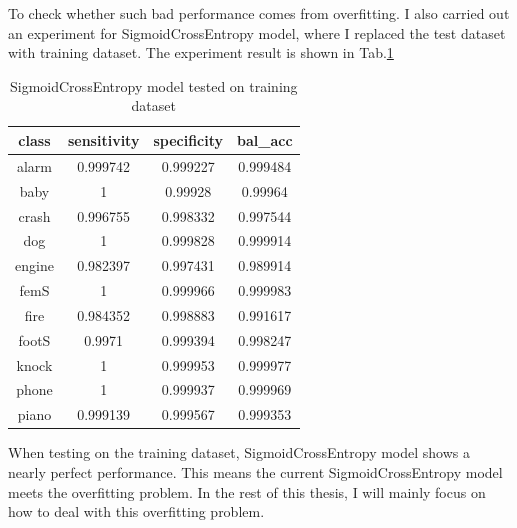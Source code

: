 To check whether such bad performance comes from overfitting. I also carried out an experiment for SigmoidCrossEntropy model, where I replaced the test dataset with training dataset. The experiment result is shown in Tab.\ref{tab:SCEoverfitting}
\begin{table}[h!]
	\caption{SigmoidCrossEntropy model tested on training dataset}
	\label{tab:SCEoverfitting}
	\centering
	\begin{tabular}{|c|c|c|c|}
		\hline	class 	&	 \textbf{sensitivity}	&	 \textbf{specificity} 	&	 \textbf{bal\_acc}	\\
		\hline	alarm 	&	0.999742	&	0.999227	&	0.999484	\\
		\hline	baby 	&	1	&	0.99928	&	0.99964	\\
		\hline	crash 	&	0.996755	&	0.998332	&	0.997544	\\
		\hline	dog 	&	1	&	0.999828	&	0.999914	\\
		\hline	engine 	&	0.982397	&	0.997431	&	0.989914	\\
		\hline	femS 	&	1	&	0.999966	&	0.999983	\\
		\hline	fire 	&	0.984352	&	0.998883	&	0.991617	\\
		\hline	footS 	&	0.9971	&	0.999394	&	0.998247	\\
		\hline	knock 	&	1	&	0.999953	&	0.999977	\\
		\hline	phone 	&	1	&	0.999937	&	0.999969	\\
		\hline	piano 	&	0.999139	&	0.999567	&	0.999353	\\
		\hline
	\end{tabular} 
\end{table}
When testing on the training dataset, SigmoidCrossEntropy model shows a nearly perfect performance. This means the current SigmoidCrossEntropy model meets the overfitting problem. In the rest of this thesis, I will mainly focus on how to deal with this overfitting problem.